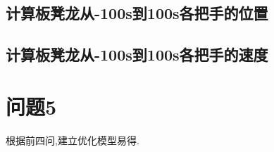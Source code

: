 \documentclass[lang=cn,newtx,10pt,scheme=chinese]{../Template/elegantbook}
\begin{document}
\section{计算板凳龙从-100s到100s各把手的位置}




\section{计算板凳龙从-100s到100s各把手的速度}




\chapter{问题5}

根据前四问,建立优化模型易得.
\end{document}
